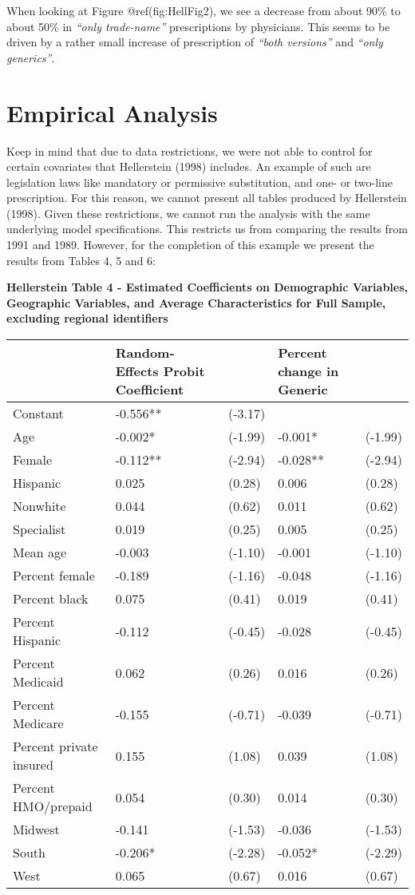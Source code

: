 \documentclass[
]{book}
\begin{document}
When looking at Figure @ref(fig:HellFig2), we see a decrease from about
90\% to about 50\% in \emph{``only trade-name''} prescriptions by
physicians. This seems to be driven by a rather small increase of
prescription of \emph{``both versions''} and \emph{``only generics''}.

\hypertarget{empirical-analysis}{%
\section{Empirical Analysis}\label{empirical-analysis}}

Keep in mind that due to data restrictions, we were not able to control
for certain covariates that Hellerstein (1998) includes. An example of
such are legislation laws like mandatory or permissive substitution, and
one- or two-line prescription. For this reason, we cannot present all
tables produced by Hellerstein (1998). Given these restrictions, we
cannot run the analysis with the same underlying model specifications.
This restricts us from comparing the results from 1991 and 1989.
However, for the completion of this example we present the results from
Tables 4, 5 and 6:

\textbf{Hellerstein Table 4 - Estimated Coefficients on Demographic
Variables, Geographic Variables, and Average Characteristics for Full
Sample, excluding regional identifiers}

\begin{longtable}[]{@{}lllll@{}}
\toprule
& Random-Effects Probit Coefficient & & Percent change in Generic
&\tabularnewline
\midrule
\endhead
Constant & -0.556** & (-3.17) & &\tabularnewline
Age & -0.002* & (-1.99) & -0.001* & (-1.99)\tabularnewline
Female & -0.112** & (-2.94) & -0.028** & (-2.94)\tabularnewline
Hispanic & 0.025 & (0.28) & 0.006 & (0.28)\tabularnewline
Nonwhite & 0.044 & (0.62) & 0.011 & (0.62)\tabularnewline
Specialist & 0.019 & (0.25) & 0.005 & (0.25)\tabularnewline
Mean age & -0.003 & (-1.10) & -0.001 & (-1.10)\tabularnewline
Percent female & -0.189 & (-1.16) & -0.048 & (-1.16)\tabularnewline
Percent black & 0.075 & (0.41) & 0.019 & (0.41)\tabularnewline
Percent Hispanic & -0.112 & (-0.45) & -0.028 & (-0.45)\tabularnewline
Percent Medicaid & 0.062 & (0.26) & 0.016 & (0.26)\tabularnewline
Percent Medicare & -0.155 & (-0.71) & -0.039 & (-0.71)\tabularnewline
Percent private insured & 0.155 & (1.08) & 0.039 & (1.08)\tabularnewline
Percent HMO/prepaid & 0.054 & (0.30) & 0.014 & (0.30)\tabularnewline
Midwest & -0.141 & (-1.53) & -0.036 & (-1.53)\tabularnewline
South & -0.206* & (-2.28) & -0.052* & (-2.29)\tabularnewline
West & 0.065 & (0.67) & 0.016 & (0.67)\tabularnewline
\bottomrule
\end{longtable}
\end{document}
